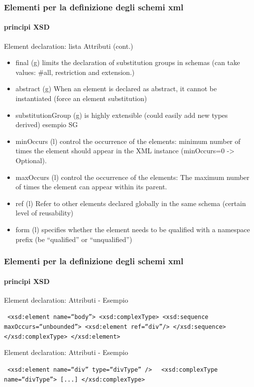 \begin{frame}
	\frametitle{Elementi per la definizione degli schemi xml}
	\framesubtitle{principi XSD}
	\addtocounter{nframe}{1}

	\begin{block}{Element declaration: lista Attributi (cont.)}

		\begin{itemize}
			\item final (g) limits the declaration of substitution groups in schemas (can take values: \#all, restriction and extension.)
			\item abstract (g) When an element is declared as abstract, it cannot be instantiated (force an element substitution)
			\item substitutionGroup (g) is highly extensible (could easily add new types derived) esempio SG
			\item minOccurs (l) control the occurrence of the elements: minimum number of times the element should appear in the XML instance (minOccurs=0 -> Optional).
			\item maxOccurs (l) control the occurrence of the elements: The maximum number of times the element can appear within its parent.
			\item ref (l) Refer to other elements declared globally in the same schema (certain level of reusability)
			\item form (l) specifies whether the element needs to be qualified with a namespace prefix (be ``qualified'' or ``unqualified'')
		\end{itemize}



	\end{block}

\end{frame}


\begin{frame}
	\frametitle{Elementi per la definizione degli schemi xml}
	\framesubtitle{principi XSD}
	\addtocounter{nframe}{1}

	\begin{block}{Element declaration: Attributi - Esempio }

		\texttt{
			<xsd:element name=``body''>
			<xsd:complexType>
			<xsd:sequence maxOccurs=``unbounded''>
			<xsd:element ref=``div''/>
			</xsd:sequence>
			</xsd:complexType>
			</xsd:element>
		}

	\end{block}


	\begin{block}{Element declaration: Attributi - Esempio }

		\texttt{
			<xsd:element name=``div'' type=``divType'' />
		}
		\texttt{
			<xsd:complexType name=``divType''>
			[...]
			</xsd:complexType>
		}

	\end{block}

\end{frame}

